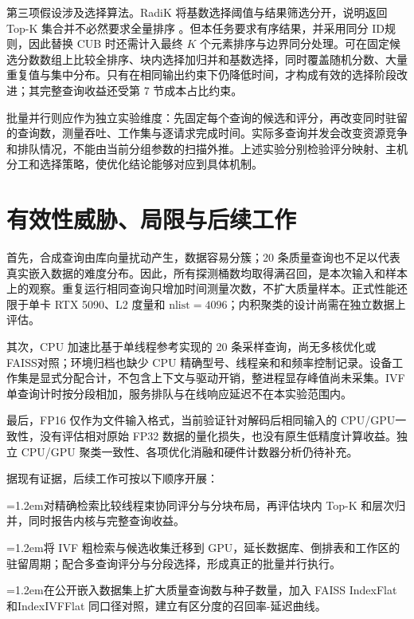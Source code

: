 \documentclass[UTF8,a4paper,zihao=5,fontset=none]{ctexart}
\begin{document}
第三项假设涉及选择算法。RadiK 将基数选择阈值与结果筛选分开，说明返回Top-K 集合并不必然要求全量排序 \cite{r6}。但本任务要求有序结果，并采用同分 ID规则，因此替换 CUB 时还需计入最终 $K$ 个元素排序与边界同分处理。可在固定候选分数数组上比较全排序、块内选择加归并和基数选择，同时覆盖随机分数、大量重复值与集中分布。只有在相同输出约束下仍降低时间，才构成有效的选择阶段改进；其完整查询收益还受第 7 节成本占比约束。


批量并行则应作为独立实验维度：先固定每个查询的候选和评分，再改变同时驻留的查询数，测量吞吐、工作集与逐请求完成时间。实际多查询并发会改变资源竞争和排队情况，不能由当前分组参数的扫描外推。上述实验分别检验评分映射、主机分工和选择策略，使优化结论能够对应到具体机制。


\section{有效性威胁、局限与后续工作}

首先，合成查询由库向量扰动产生，数据容易分簇；20 条质量查询也不足以代表真实嵌入数据的难度分布。因此，所有探测桶数均取得满召回，是本次输入和样本上的观察。重复运行相同查询只增加时间测量次数，不扩大质量样本。正式性能还限于单卡 RTX 5090、L2 度量和 $\mathrm{nlist}=4096$；内积聚类的设计尚需在独立数据上评估。


其次，CPU 加速比基于单线程参考实现的 20 条采样查询，尚无多核优化或 FAISS对照；环境归档也缺少 CPU 精确型号、线程亲和和频率控制记录。设备工作集是显式分配合计，不包含上下文与驱动开销，整进程显存峰值尚未采集。IVF 单查询计时按分段相加，服务排队与在线响应延迟不在本实验范围内。


最后，FP16 仅作为文件输入格式，当前验证针对解码后相同输入的 CPU/GPU一致性，没有评估相对原始 FP32 数据的量化损失，也没有原生低精度计算收益。独立 CPU/GPU 聚类一致性、各项优化消融和硬件计数器分析仍待补充。


据现有证据，后续工作可按以下顺序开展：


\par\noindent\hangindent=1.2em\textbullet\quad 对精确检索比较线程束协同评分与分块布局，再评估块内 Top-K 和层次归并，同时报告内核与完整查询收益。\par

\par\noindent\hangindent=1.2em\textbullet\quad 将 IVF 粗检索与候选收集迁移到 GPU，延长数据库、倒排表和工作区的驻留周期；配合多查询评分与分段选择，形成真正的批量并行执行。\par

\par\noindent\hangindent=1.2em\textbullet\quad 在公开嵌入数据集上扩大质量查询数与种子数量，加入 FAISS {\small\ttfamily IndexFlat} 和{\small\ttfamily IndexIVFFlat} 同口径对照，建立有区分度的召回率-延迟曲线。\par
\end{document}

